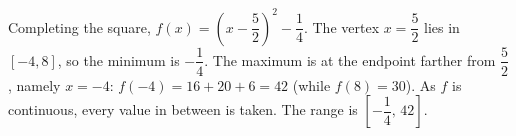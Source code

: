 Completing the square, $f(x)=\left(x-\dfrac52\right)^2-\dfrac14$. The vertex $x=\dfrac52$ lies in $[-4,8]$, so the minimum is $-\dfrac14$. The maximum is at the endpoint farther from $\dfrac52$, namely $x=-4$: $f(-4)=16+20+6=42$ (while $f(8)=30$). As $f$ is continuous, every value in between is taken. The range is $\boxed{\left[-\dfrac14,\,42\right]}$.

